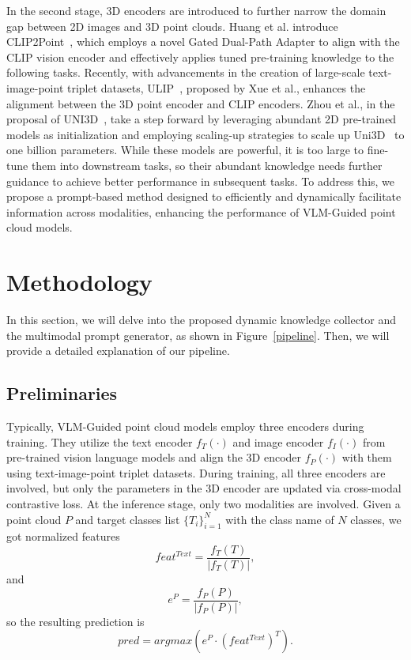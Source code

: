 \documentclass{ecai}
\begin{document}
In the second stage, 3D encoders are introduced to further narrow the domain gap between 2D images and 3D point clouds. Huang et al. introduce CLIP2Point~\cite{huang2023clip2point}, which employs a novel Gated Dual-Path Adapter to align with the CLIP vision encoder and effectively applies tuned pre-training knowledge to the following tasks. Recently, with advancements in the creation of large-scale text-image-point triplet datasets, ULIP~\cite{xue2023ulip}, proposed by Xue et al., enhances the alignment between the 3D point encoder and CLIP encoders. Zhou et al., in the proposal of UNI3D~\cite{zhang2023uni3d}, take a step forward by leveraging abundant 2D pre-trained models as initialization and employing scaling-up strategies to scale up Uni3D~\cite{zhang2023uni3d} to one billion parameters. While these models are powerful, it is too large to fine-tune them into downstream tasks, so their abundant knowledge needs further guidance to achieve better performance in subsequent tasks. To address this, we propose a prompt-based method designed to efficiently and dynamically facilitate information across modalities, enhancing the performance of VLM-Guided point cloud models.

\section{Methodology}\label{Methodology}
In this section, we will delve into the proposed dynamic knowledge collector and the multimodal prompt generator, as shown in Figure~\ref{pipeline}. Then, we will provide a detailed explanation of our pipeline.


\subsection{Preliminaries}
Typically, VLM-Guided point cloud models employ three encoders during training. They utilize the text encoder $f_T(\cdot)$ and image encoder $f_I(\cdot)$ from pre-trained vision language models and align the 3D encoder $f_P(\cdot)$ with them using text-image-point triplet datasets. During training, all three encoders are involved, but only the parameters in the 3D encoder are updated via cross-modal contrastive loss. At the inference stage, only two modalities are involved. Given a point cloud $P$ and target classes list $\{T_i\}_{i=1}^N$ with the class name of  $N$ classes, we got normalized features \begin{equation}\label{eqn-1} feat^{Text} = \frac{f_T(T)}{|f_T(T)|},\end{equation} and \begin{equation}\label{eqn-2} e^P = \frac{f_P(P)}{|f_P(P)|},\end{equation} so the resulting prediction is \begin{equation}\label{eqn-3} pred = argmax(e^P\cdot (feat^{Text})^T).\end{equation}
\end{document}

